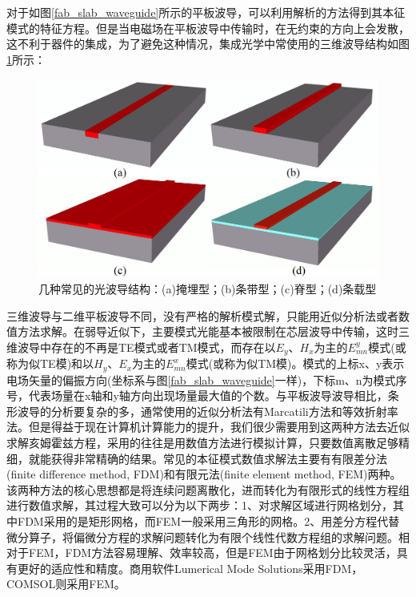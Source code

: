 对于如图\ref{fab_slab_waveguide}所示的平板波导，可以利用解析的方法得到其本征模式的特征方程\cite{ttt2005jcgx}。但是当电磁场在平板波导中传输时，在无约束的方向上会发散，这不利于器件的集成，为了避免这种情况，集成光学中常使用的三维波导结构如图\ref{fab_strip_waveguide}所示：

\begin{figure}[htb]
	\centering
	\includegraphics[width=13cm]{./Pictures/fab_strip_waveguide.jpg}
	\captionsetup{justification=centering}
	\caption{几种常见的光波导结构：(a)掩埋型；(b)条带型；(c)脊型；(d)条载型}
	\label{fab_strip_waveguide}
\end{figure}

三维波导与二维平板波导不同，没有严格的解析模式解，只能用近似分析法或者数值方法求解。在弱导近似下，主要模式光能基本被限制在芯层波导中传输，这时三维波导中存在的不再是TE模式或者TM模式，而存在以$E_y$、$H_x$为主的$E_{mn}^y$模式(或称为似TE模)和以$H_y$、$E_x$为主的$E_{mn}^x$模式(或称为似TM模)。模式的上标x、y表示电场矢量的偏振方向(坐标系与图\ref{fab_slab_waveguide}一样)，下标m、n为模式序号，代表场量在x轴和y轴方向出现场量最大值的个数。与平板波导波导相比，条形波导的分析要复杂的多，通常使用的近似分析法有Marcatili方法和等效折射率法\cite{okamoto2006fundamentals}。但是得益于现在计算机计算能力的提升，我们很少需要用到这两种方法去近似求解亥姆霍兹方程，采用的往往是用数值方法进行模拟计算，只要数值离散足够精细，就能获得非常精确的结果。常见的本征模式数值求解法主要有有限差分法(finite difference method, FDM)\cite{stern1988semivectorial}和有限元法(finite element method, FEM)\cite{jin2015finite}两种。该两种方法的核心思想都是将连续问题离散化，进而转化为有限形式的线性方程组进行数值求解，其过程大致可以分为以下两步：1、对求解区域进行网格划分，其中FDM采用的是矩形网格，而FEM一般采用三角形的网格。2、用差分方程代替微分算子，将偏微分方程的求解问题转化为有限个线性代数方程组的求解问题。相对于FEM，FDM方法容易理解、效率较高，但是FEM由于网格划分比较灵活，具有更好的适应性和精度。商用软件Lumerical Mode Solutions\cite{modesolution}采用FDM，COMSOL\cite{comsol}则采用FEM。

